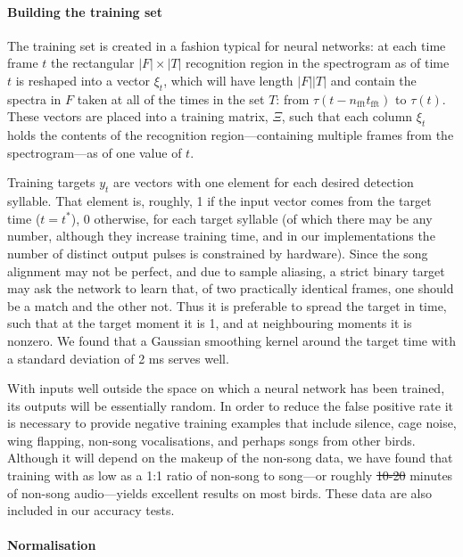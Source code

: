 \documentclass[10pt,letterpaper]{article}
\renewcommand{\subsubsection}[1]{\paragraph{#1}}
\providecommand{\DIFaddtex}[1]{{\protect\color{blue}\uwave{#1}}} %
\providecommand{\DIFdeltex}[1]{{\protect\color{red}\sout{#1}}}                      %
\providecommand{\DIFaddbegin}{} %
\providecommand{\DIFaddend}{} %
\providecommand{\DIFdelbegin}{} %
\providecommand{\DIFdelend}{} %
\providecommand{\DIFadd}[1]{\texorpdfstring{\DIFaddtex{#1}}{#1}} %
\providecommand{\DIFdel}[1]{\texorpdfstring{\DIFdeltex{#1}}{}} %
\newcommand{\DIFscaledelfig}{0.5}
\newlength{\DIFdelgraphicswidth} %
\newlength{\DIFdelgraphicsheight} %
\newcommand{\DIFaddincludegraphics}[2][]{{\color{blue}\fbox{\DIFOincludegraphics[#1]{#2}}}} %
\newcommand{\DIFdelincludegraphics}[2][]{%
\sbox{\DIFdelgraphicsbox}{\DIFOincludegraphics[#1]{#2}}%
\settoboxwidth{\DIFdelgraphicswidth}{\DIFdelgraphicsbox} %
\settoboxtotalheight{\DIFdelgraphicsheight}{\DIFdelgraphicsbox} %
\scalebox{\DIFscaledelfig}{%
\parbox[b]{\DIFdelgraphicswidth}{\usebox{\DIFdelgraphicsbox}\\[-\baselineskip] \rule{\DIFdelgraphicswidth}{0em}}\llap{\resizebox{\DIFdelgraphicswidth}{\DIFdelgraphicsheight}{%
\setlength{\unitlength}{\DIFdelgraphicswidth}%
\begin{picture}(1,1)%
\thicklines\linethickness{2pt} %
{\color[rgb]{1,0,0}\put(0,0){\framebox(1,1){}}}%
{\color[rgb]{1,0,0}\put(0,0){\line( 1,1){1}}}%
{\color[rgb]{1,0,0}\put(0,1){\line(1,-1){1}}}%
\end{picture}%
}\hspace*{3pt}}} %
} %
\DeclareRobustCommand{\DIFaddbegin}{\DIFOaddbegin \let\includegraphics\DIFaddincludegraphics} %
\DeclareRobustCommand{\DIFaddend}{\DIFOaddend \let\includegraphics\DIFOincludegraphics} %
\DeclareRobustCommand{\DIFdelbegin}{\DIFOdelbegin \let\includegraphics\DIFdelincludegraphics} %
\DeclareRobustCommand{\DIFdelend}{\DIFOaddend \let\includegraphics\DIFOincludegraphics} %
\begin{document}
\subsubsection{Building the training set}

The training set is created in a fashion typical for neural networks:
at each time frame $t$ the rectangular $|F|\times |T|$ recognition
region in the spectrogram as of time $t$ is reshaped into a vector
$\xi_t$, which will have length $|F||T|$ and contain the spectra in
$F$ taken at all of the times in the set $T$: from
$\tau(t-n_\textrm{fft}t_\textrm{fft})$ to $\tau(t)$.  These vectors
are placed into a training matrix, $\Xi$, such that each column
$\xi_t$ holds the contents of the recognition region---containing
multiple frames from the spectrogram---as of one value of $t$.

Training targets $y_t$ are vectors with one element for each desired
detection syllable.  That element is, roughly, 1 if the input vector
comes from the target time ($t=t^*$), 0 otherwise, for each target
syllable (of which there may be any number, although they increase
training time, and in our implementations the number of distinct
output pulses is constrained by hardware).  Since the song alignment
may not be perfect, and due to sample aliasing, a
strict binary target may ask the network to learn that, of two
practically identical frames, one should be a match and the other
not. Thus it is preferable to spread the target in time, such that at
the target moment it is 1, and at neighbouring moments it is
nonzero. We found that a Gaussian smoothing kernel around the target
time with a standard deviation of 2 ms serves well.

With inputs well outside the space on which a neural network has been
trained, its outputs will be essentially random. In order to reduce
the false positive rate it is necessary to provide negative training
examples that include silence, cage noise, wing flapping, non-song
vocalisations, and perhaps songs from other birds.  Although it will
depend on the makeup of the non-song data, we have found that training
with as low as a 1:1 ratio of non-song to song---or roughly \DIFdelbegin \DIFdel{10-20
}\DIFdelend \DIFaddbegin \DIFadd{10
}\DIFaddend minutes of non-song audio---yields excellent results on most birds.
These data are also included in our accuracy tests.


\subsubsection{Normalisation}
\end{document}
